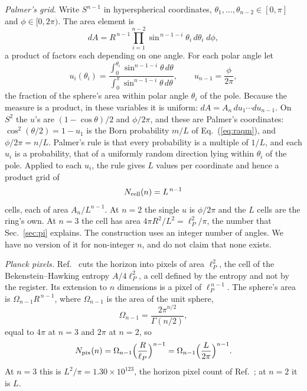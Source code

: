 \documentclass[aps,prd,twocolumn,superscriptaddress,nofootinbib]{revtex4-2}
\begin{document}
\textit{Palmer's grid.} Write $S^{n-1}$ in hyperspherical coordinates, $\theta_1,\dots,\theta_{n-2}\in[0,\pi]$ and $\phi\in[0,2\pi)$. The area element is
\begin{equation}
dA = R^{\,n-1}\prod_{i=1}^{n-2}\sin^{\,n-1-i}\theta_i\,d\theta_i\;d\phi,
\label{eq:dA}
\end{equation}
a product of factors each depending on one angle. For each polar angle let
\begin{equation}
u_i(\theta_i) = \frac{\int_0^{\theta_i}\sin^{n-1-i}\theta\,d\theta}{\int_0^{\pi}\sin^{n-1-i}\theta\,d\theta},\qquad u_{n-1} = \frac{\phi}{2\pi},
\label{eq:u}
\end{equation}
the fraction of the sphere's area within polar angle $\theta_i$ of the pole. Because the measure is a product, in these variables it is uniform: $dA = A_n\,du_1\cdots du_{n-1}$. On $S^2$ the $u$'s are $(1-\cos\theta)/2$ and $\phi/2\pi$, and these are Palmer's coordinates: $\cos^2(\theta/2) = 1 - u_1$ is the Born probability $m/L$ of Eq.~(\ref{eq:raqm}), and $\phi/2\pi = n/L$. Palmer's rule is that every probability is a multiple of $1/L$, and each $u_i$ is a probability, that of a uniformly random direction lying within $\theta_i$ of the pole. Applied to each $u_i$, the rule gives $L$ values per coordinate and hence a product grid of
\begin{equation}
N_{\rm cell}(n) = L^{\,n-1}
\label{eq:cells}
\end{equation}
cells, each of area $A_n/L^{n-1}$. At $n=2$ the single $u$ is $\phi/2\pi$ and the $L$ cells are the ring's own. At $n=3$ the cell has area $4\pi R^2/L^2 = \ell_P^2/\pi$, the number that Sec.~\ref{sec:pi} explains. The construction uses an integer number of angles. We have no version of it for non-integer $n$, and do not claim that none exists.

\textit{Planck pixels.} Ref.~\cite{korytko2026} cuts the horizon into pixels of area $\ell_P^2$, the cell of the Bekenstein--Hawking entropy $A/4\ell_P^2$, a cell defined by the entropy and not by the register. Its extension to $n$ dimensions is a pixel of $\ell_P^{\,n-1}$. The sphere's area is $\Omega_{n-1}R^{\,n-1}$, where $\Omega_{n-1}$ is the area of the unit sphere,
\begin{equation}
\Omega_{n-1} = \frac{2\pi^{n/2}}{\Gamma(n/2)},
\label{eq:omega}
\end{equation}
equal to $4\pi$ at $n=3$ and $2\pi$ at $n=2$, so
\begin{equation}
N_{\rm pix}(n) = \Omega_{n-1}\Big(\frac{R}{\ell_P}\Big)^{n-1} = \Omega_{n-1}\Big(\frac{L}{2\pi}\Big)^{n-1}.
\label{eq:supply}
\end{equation}
At $n=3$ this is $L^2/\pi = 1.30\times10^{123}$, the horizon pixel count of Ref.~\cite{korytko2026c}; at $n=2$ it is $L$.
\end{document}
